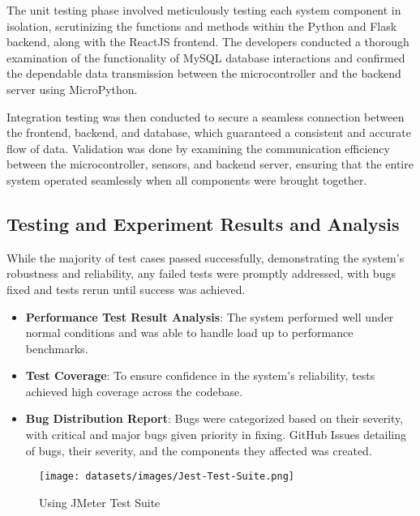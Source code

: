 The unit testing phase involved meticulously testing each system component in isolation,
scrutinizing the functions and methods within the Python and Flask backend, along
with the ReactJS frontend. %
The developers conducted a thorough examination of the functionality of MySQL database interactions and confirmed the dependable data
transmission between the microcontroller and the backend server using MicroPython. %

Integration testing was then conducted to secure a seamless connection between
the frontend, backend, and database, which guaranteed a consistent and accurate
flow of data. %
Validation was done by examining the communication efficiency between the microcontroller, sensors, and backend server, ensuring that the entire system
operated seamlessly when all components were brought together. %

\subsection{Testing and Experiment Results and Analysis}\label{subsec:testing-and-experiment-results-and-analysis}

While the majority of test cases passed successfully, demonstrating the system’s
robustness and reliability, any failed tests were promptly addressed,
with bugs fixed and tests rerun until success was achieved. %

\begin{itemize}
    \item \textbf{Performance Test Result Analysis}: The system performed well
    under normal conditions and was able to handle load up to performance benchmarks. %
    \item \textbf{Test Coverage}: To ensure confidence in the system’s reliability,
    tests achieved high coverage across the codebase. %
    \item \textbf{Bug Distribution Report}: Bugs were categorized based on their
    severity, with critical and major bugs given priority in fixing.  %
    GitHub Issues detailing of bugs, their severity, and the components
    they affected was created. %
\end{itemize}

\begin{figure}[htbp]
    \centering
    \texttt{[image: datasets/images/Jest-Test-Suite.png]}
    \caption{Using JMeter Test Suite}
    \label{fig:figure2}

\end{figure}

